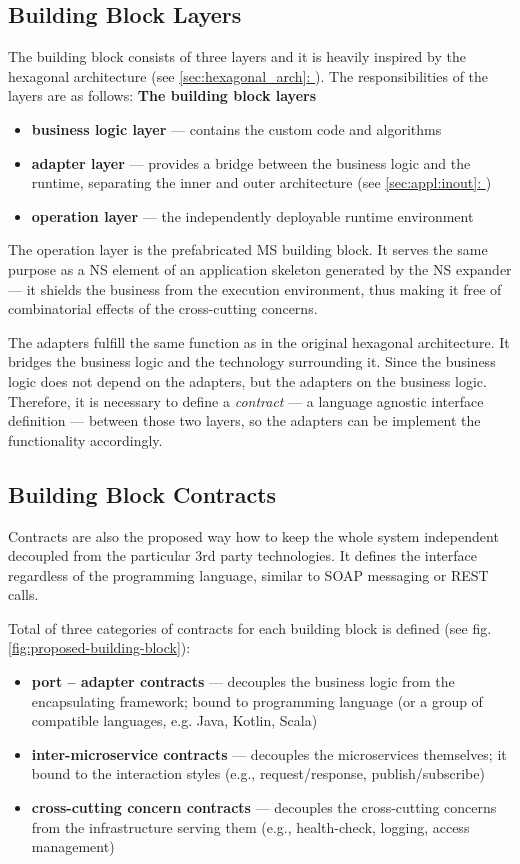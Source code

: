 \documentclass[thesis=M,english,hidelinks]{FITthesis}[2012/10/20]
\newcommand*{\fullref}[1]{\hyperref[{#1}]{\autoref*{#1}: \textit{\nameref*{#1}}}}
\begin{document}
\subsection{Building Block Layers}
The building block consists of three layers and it is heavily inspired by the hexagonal architecture (see \fullref{sec:hexagonal_arch}). The responsibilities of the layers are as follows:
\textbf{The building block layers}
\begin{itemize}
    \item \textbf{business logic layer} --- contains the custom code and algorithms 
    \item \textbf{adapter layer} --- provides a bridge between the business logic and the runtime, separating the inner and outer architecture (see \fullref{sec:appl:inout})
    \item \textbf{operation layer} --- the independently deployable runtime environment
\end{itemize}

The operation layer is the prefabricated \acrshort{MS} building block. It serves the same purpose as a \acrshort{NS} element of an application skeleton generated by the \acrshort{NS} expander --- it shields the business from the execution environment, thus making it free of combinatorial effects of the cross-cutting concerns.

The adapters fulfill the same function as in the original hexagonal architecture. It bridges the business logic and the technology surrounding it. Since the business logic does not depend on the adapters, but the adapters on the business logic. Therefore, it is necessary to define a \textit{contract} --- a language agnostic interface definition --- between those two layers, so the adapters can be implement the functionality accordingly.

\subsection{Building Block Contracts}
Contracts are also the proposed way how to keep the whole system independent decoupled from the particular 3rd party technologies. It defines the interface regardless of the programming language, similar to \acrshort{SOAP} messaging or \acrshort{REST} calls.

Total of three categories of contracts for each building block is defined (see fig. \ref{fig:proposed-building-block}):
\begin{itemize}
    \item \textbf{port -- adapter contracts} --- decouples the business logic from the encapsulating framework; bound to programming language (or a group of compatible languages, e.g. Java, Kotlin, Scala)
    \item \textbf{inter-microservice contracts} --- decouples the microservices themselves; it bound to the interaction styles (e.g., request/response, publish/subscribe)
    \item \textbf{cross-cutting concern contracts} --- decouples the cross-cutting concerns from the infrastructure serving them (e.g., health-check, logging, access management)
\end{itemize}
\end{document}
